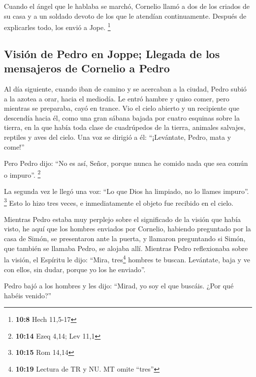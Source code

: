 \begin{paracol}{2}
 Cuando el ángel que le hablaba se marchó, Cornelio llamó
a dos de los criados de su casa y a un soldado devoto de los que le
atendían continuamente.  Después de explicarles todo, los
envió a Jope. \footnote{\textbf{10:8} Hech 11,5-17}

\hypertarget{visiuxf3n-de-pedro-en-joppe-llegada-de-los-mensajeros-de-cornelio-a-pedro}{%
\subsection{Visión de Pedro en Joppe; Llegada de los mensajeros de
Cornelio a
Pedro}\label{visiuxf3n-de-pedro-en-joppe-llegada-de-los-mensajeros-de-cornelio-a-pedro}}

 Al día siguiente, cuando iban de camino y se acercaban a
la ciudad, Pedro subió a la azotea a orar, hacia el mediodía.
 Le entró hambre y quiso comer, pero mientras se
preparaba, cayó en trance.  Vio el cielo abierto y un
recipiente que descendía hacia él, como una gran sábana bajada por
cuatro esquinas sobre la tierra,  en la que había toda
clase de cuadrúpedos de la tierra, animales salvajes, reptiles y aves
del cielo.  Una voz se dirigió a él: ``¡Levántate, Pedro,
mata y come!''

 Pero Pedro dijo: ``No es así, Señor, porque nunca he
comido nada que sea común o impuro''. \footnote{\textbf{10:14} Ezeq
  4,14; Lev 11,1}

 La segunda vez le llegó una voz: ``Lo que Dios ha
limpiado, no lo llames impuro''. \footnote{\textbf{10:15} Rom 14,14}
 Esto lo hizo tres veces, e inmediatamente el objeto fue
recibido en el cielo.

 Mientras Pedro estaba muy perplejo sobre el significado
de la visión que había visto, he aquí que los hombres enviados por
Cornelio, habiendo preguntado por la casa de Simón, se presentaron ante
la puerta,  y llamaron preguntando si Simón, que también
se llamaba Pedro, se alojaba allí.  Mientras Pedro
reflexionaba sobre la visión, el Espíritu le dijo: ``Mira,
tres\footnote{\textbf{10:19} Lectura de TR y NU. MT omite ``tres''}
hombres te buscan.  Levántate, baja y ve con ellos, sin
dudar, porque yo los he enviado''.

 Pedro bajó a los hombres y les dijo: ``Mirad, yo soy el
que buscáis. ¿Por qué habéis venido?''


\end{paracol}
